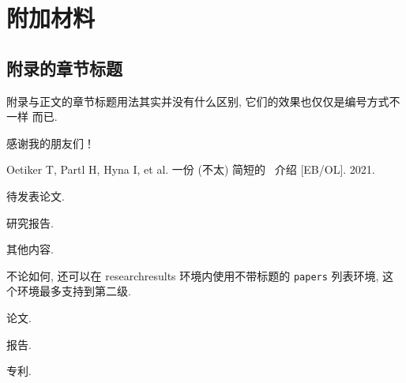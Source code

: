 \documentclass[newenv,newcmd]{ncuthesis}
\begin{document}
\chapter{附加材料}
\section{附录的章节标题}
附录与正文的章节标题用法其实并没有什么区别, 它们的效果也仅仅是编号方式不一样
而已. 
\backmatter

\begin{acknowledgements}
  感谢我的朋友们！
\end{acknowledgements}
\begin{researchresults}
\begin{published}
\item Oetiker T, Partl H, Hyna I, et al. 一份 (不太) 简短的
\LaTeXe\ 介绍 [EB/OL]. 2021.
\end{published}
\begin{tobepublished}
\item 待发表论文. 
\end{tobepublished}
\begin{reports}
\item 研究报告. 
\end{reports}
\begin{others}[另外还有]
\item 其他内容. 
\end{others}
不论如何, 还可以在 \textsf{researchresults} 环境内使用不带标题的
\texttt{papers} 列表环境, 这个环境最多支持到第二级. 
\begin{papers}
\item 论文.
\item 报告.
  \begin{papers}
    \item 专利. 
  \end{papers}
\end{papers}
\end{researchresults}
\end{document}
